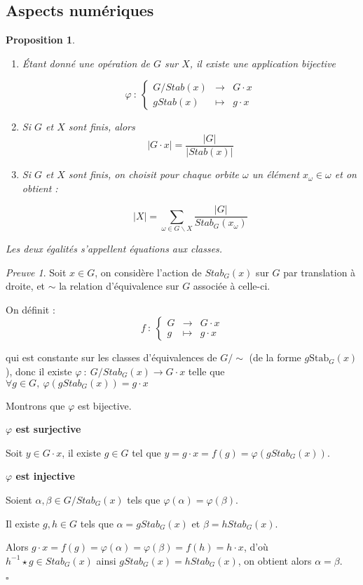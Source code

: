 \documentclass[]{article}
\newtheorem{myproposition}{Proposition}
\theoremstyle{remark}
\newtheorem{myproof}{Preuve}
\theoremstyle{definition}
\newcommand{\cqfd}{
	\hfill$\square$
}
\newcommand{\func}[5]{
#1 ~ : ~ \left\{ \begin{array}{lcl}
	#2 & \longrightarrow & #3 \\
	#4 & \longmapsto & #5
\end{array}
\right.
}
\newcommand{\funcshort}[3]{
#1 ~ : ~ #2 \longrightarrow #3
}
\newenvironment{proofpart}[1]{
	\noindent
	{\textbf{\boldmath #1}}
}{
	\checkmark
}
\begin{document}
\subsection{Aspects numériques}

\begin{myproposition}
	\leavevmode
	\begin{enumerate}
		\item Étant donné une opération de $G$ sur $X$, il existe une application bijective
		
		$$\func{\varphi}{G/Stab(x)}{G \cdot x}{g Stab(x)}{g \cdot x}$$
		
		\item Si $G$ et $X$ sont finis, alors $$|G \cdot x| = \frac{|G|}{|Stab(x)|}$$
		
		\item Si $G$ et $X$ sont finis, on choisit pour chaque orbite $\omega$ un élément $x_\omega \in \omega$ et on obtient :
		
		$$|X| = \sum_{\omega \in G \backslash X} \frac{|G|}{Stab_G(x_\omega)}$$
	\end{enumerate}
	
	Les deux égalités s'appellent \textit{équations aux classes}.
\end{myproposition}

\begin{myproof}
	Soit $x \in G$, on considère l'action de $Stab_G(x)$ sur $G$ par translation à droite, et $\sim$ la relation d'équivalence sur $G$ associée à celle-ci.
	
	On définit : $$\func{f}{G}{G \cdot x}{g}{g \cdot x}$$
	
	qui est constante sur les classes d'équivalences de $G/\sim$ (de la forme $g\text{Stab}_G(x)$), donc il existe $\funcshort{\varphi}{G/Stab_G(x)}{G \cdot x}$ telle que $\forall g \in G, ~ \varphi(gStab_G(x))=g \cdot x$
	
	Montrons que $\varphi$ est bijective.
	
	\begin{proofpart}{$\varphi$ est surjective}
	
		Soit $y \in G \cdot x$, il existe $g \in G$ tel que $y = g \cdot x = f(g) = \varphi(g Stab_G(x))$.
	\end{proofpart}
	
	\begin{proofpart}{$\varphi$ est injective}
	
		Soient $\alpha, \beta \in G/Stab_G(x)$ tels que $\varphi(\alpha) = \varphi(\beta)$.
		
		Il existe $g, h \in G$ tels que $\alpha = g Stab_G(x)$ et $\beta = h Stab_G(x)$.
		
		Alors $g \cdot x=f(g)=\varphi(\alpha)=\varphi(\beta)=f(h)=h \cdot x$, d'où $h^{-1} \star g \in Stab_G(x)$ ainsi $gStab_G(x)=hStab_G(x)$, on obtient alors $\alpha = \beta$.
	\end{proofpart}
	
	\cqfd
\end{myproof}
\end{document}
